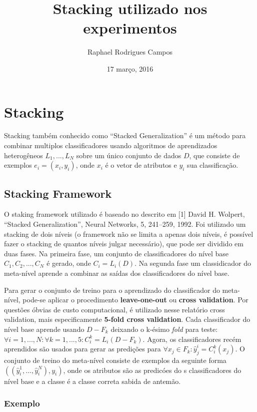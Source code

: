 \documentclass[]{article}
\title{Stacking utilizado nos experimentos}
\author{Raphael Rodrigues Campos}
\date{17 março, 2016}
\begin{document}
\maketitle


\section{Stacking}\label{stacking}

Stacking também conhecido como ``Stacked Generalization'' é um método
para combinar multiplos classificadores usando algoritmos de
aprendizados heterogêneos \(L_1, ..., L_N\) sobre um único conjunto de
dados \(D\), que consiste de exemplos \(e_i = (x_i, y_i)\), onde \(x_i\)
é o vetor de atributos e \(y_i\) sua classificação.

\subsection{Stacking Framework}\label{stacking-framework}

O staking framework utilizado é baseado no descrito em {[}1{]} David H.
Wolpert, ``Stacked Generalization'', Neural Networks, 5, 241--259, 1992.
Foi utilizado um stacking de dois níveis (o framework não se limita a
apenas dois níveis, é possível fazer o stacking de quantos níveis julgar
necessário), que pode ser dividido em duas fases. Na primeira fase, um
conjunto de classificadores do nível base \(C_1, C_2, ..., C_N\) é
gerado, onde \(C_i = L_i(D)\). Na segunda fase um classidicador do
meta-nível aprende a combinar as saídas dos classificadores do nível
base.

Para gerar o conjunto de treino para o aprendizado do classificador do
meta-nível, pode-se aplicar o procedimento \textbf{leave-one-out} ou
\textbf{cross validation}. Por questões óbvias de custo computacional, é
utilizado nesse relatório cross validation, mais especificamente
\textbf{5-fold cross validation}. Cada classificador do nível base
aprende usando \(D - F_k\) deixando o k-ésimo \emph{fold} para teste:
\(\forall i = 1,...,N : \forall k = 1,...,5 : C^{k}_i = L_i(D-F_k)\).
Agora, os classificadores recém aprendidos são usados para gerar as
predições para \(\forall x_j \in F_k:\hat{y}_j^i=C^k_i(x_j)\). O
conjunto de treino do meta-nível consiste de exemplos da seguinte forma
\(((\hat{y}_i^1,..., \hat{y}_i^N), y_i)\), onde os atributos são as
predicóes do s classificadores do nível base e a classe é a classe
correta sabida de antemão.

\subsubsection{Exemplo}\label{exemplo}
\end{document}
